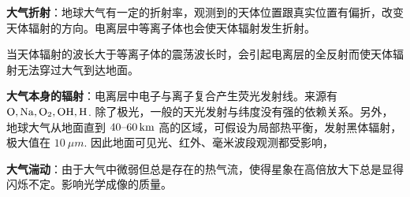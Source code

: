 \documentclass[UTF8, 12pt, a4paper, oneside, onecolumn, fontset=none]{ctexart}
\begin{document}
\textbf{大气折射}：地球大气有一定的折射率，观测到的天体位置跟真实位置有偏折，改变天体辐射的方向。电离层中等离子体也会使天体辐射发生折射。

当天体辐射的波长大于等离子体的震荡波长时，会引起电离层的全反射而使天体辐射无法穿过大气到达地面。

\textbf{大气本身的辐射}：电离层中电子与离子复合产生荧光发射线。来源有 $\ce{O, Na, O2, OH, H}$. 除了极光，一般的天光发射与纬度没有强的依赖关系。另外，地球大气从地面直到 $40\text{\textendash}\qty{60}{km}$ 高的区域，可假设为局部热平衡，发射黑体辐射，极大值在 $\qty{10}{\mu m}$. 因此地面可见光、红外、毫米波段观测都受影响，

\textbf{大气湍动}：由于大气中微弱但总是存在的热气流，使得星象在高倍放大下总是显得闪烁不定。影响光学成像的质量。

\end{document}
